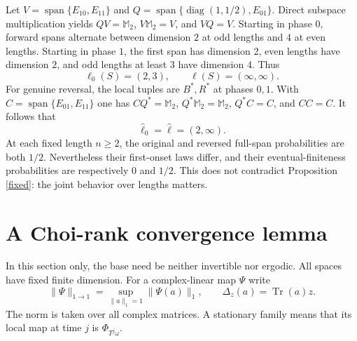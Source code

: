 \documentclass[11pt,a4paper]{article}
\newcommand{\Span}{\operatorname{span}}
\newcommand{\tr}{\operatorname{Tr}}
\begin{document}
Let $V=\Span\{E_{10},E_{11}\}$ and
$Q=\Span\{\operatorname{diag}(1,1/2),E_{01}\}$. Direct subspace multiplication yields
$QV=\mathbb M_2$, $V\mathbb M_2=V$, and $VQ=V$.
Starting in phase $0$, forward spans alternate between dimension $2$ at odd lengths and $4$ at even lengths. Starting in phase $1$, the first span has dimension $2$, even lengths have dimension $2$, and odd lengths at least $3$ have dimension $4$. Thus
\[
 \ell_0(S)=(2,3),\qquad \ell(S)=(\infty,\infty).
\]
For genuine reversal, the local tuples are $B^*,R^*$ at phases $0,1$. With $C=\Span\{E_{01},E_{11}\}$ one has $CQ^*=\mathbb M_2$, $Q^*\mathbb M_2=\mathbb M_2$, $Q^*C=C$, and $CC=C$. It follows that
\[
 \widehat\ell_0=\widehat\ell=(2,\infty).
\]
At each fixed length $n\geq2$, the original and reversed full-span probabilities are both $1/2$. Nevertheless their first-onset laws differ, and their eventual-finiteness probabilities are respectively $0$ and $1/2$. This does not contradict Proposition \ref{fixed}: the joint behavior over lengths matters.

\section{A Choi-rank convergence lemma}\label{mixsection}
In this section only, the base need be neither invertible nor ergodic. All spaces have fixed finite dimension. For a complex-linear map $\Psi$ write
\[
 \|\Psi\|_{1\to1}=\sup_{\|a\|_1=1}\|\Psi(a)\|_1,
 \qquad \Delta_z(a)=\tr(a)z.
\]
The norm is taken over all complex matrices. A stationary family means that its local map at time $j$ is $\Phi_{T^j\omega}$.
\end{document}
